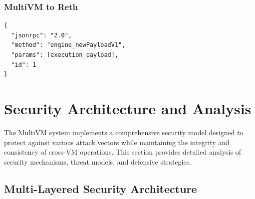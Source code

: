 \documentclass[11pt,a4paper]{article}
\begin{document}
\subsubsection{MultiVM to Reth}
\begin{lstlisting}
{
  "jsonrpc": "2.0",
  "method": "engine_newPayloadV1",
  "params": [execution_payload],
  "id": 1
}
\end{lstlisting}

\section{Security Architecture and Analysis}

The MultiVM system implements a comprehensive security model designed to protect against various attack vectors while maintaining the integrity and consistency of cross-VM operations. This section provides detailed analysis of security mechanisms, threat models, and defensive strategies.

\subsection{Multi-Layered Security Architecture}
\end{document}
